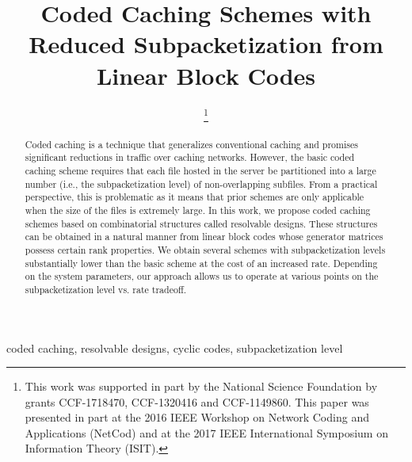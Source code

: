 \documentclass[journal,twocolumn]{IEEEtran}
\theoremstyle{definition}
\begin{document}
	\title{Coded Caching Schemes with Reduced Subpacketization from Linear Block Codes}
\author{
	\thanks{This work was supported in part by the National Science Foundation by grants CCF-1718470, CCF-1320416 and CCF-1149860. This paper was presented in part at the 2016 IEEE Workshop on Network Coding and Applications (NetCod) and at the 2017 IEEE International Symposium on Information Theory (ISIT).}}
	
	
	\maketitle
\begin{abstract}
Coded caching is a technique that generalizes conventional caching and promises significant reductions in traffic over caching networks.
However, the basic coded caching scheme requires that
each file hosted in the server be partitioned into a large number
(i.e., the subpacketization level) of non-overlapping subfiles. From
a practical perspective, this is problematic as it means that prior
schemes are only applicable when the size of the files is extremely
large. In this work, we propose coded caching schemes based on combinatorial structures called resolvable designs.
These structures can be obtained in a natural manner from linear block codes whose generator matrices possess certain rank properties.
We obtain several schemes with subpacketization levels substantially lower than the basic scheme at the cost of an increased rate. Depending on the system parameters, our approach allows
us to operate at various points on the subpacketization level vs. rate tradeoff.
\end{abstract}
\begin{IEEEkeywords}
coded caching, resolvable designs, cyclic codes, subpacketization level
\end{IEEEkeywords}
\end{document}
